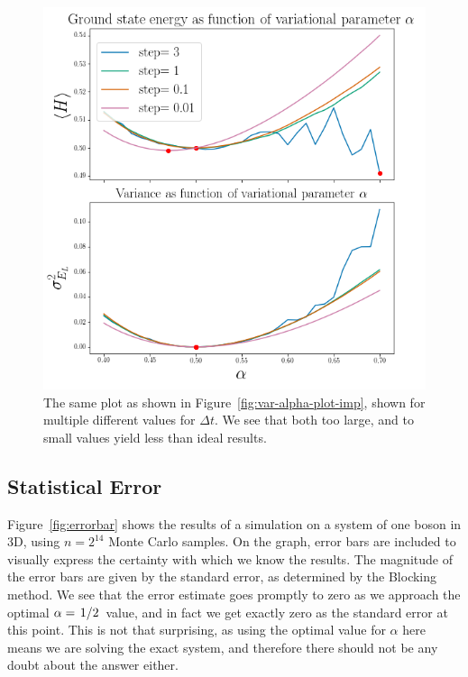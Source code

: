 \documentclass[twocolumn]{article}
\begin{document}
\begin{figure}[ht]
    \centering
    \includegraphics[width=0.9\linewidth]{../results/var-alpha-plot-imp-dts-50000.png}
    \caption{The same plot as shown in Figure~\ref{fig:var-alpha-plot-imp},
    shown for multiple different values for $\Delta t$. We see that both too
    large, and to small values yield less than ideal results.}
    \label{fig:var-alpha-plot-imp-dts}
\end{figure}

\subsection{Statistical Error}

Figure~\ref{fig:errorbar} shows the results of a simulation on a system of one
boson in 3D, using $n=2^{14}$ Monte Carlo samples. On the graph, error bars are
included to visually express the certainty with which we know the results. The
magnitude of the error bars are given by the standard error, as determined by
the Blocking method. We see that the error estimate goes promptly to zero as we
approach the optimal $\alpha=\flatfrac{1}{2}$ value, and in fact we get exactly
zero as the standard error at this point. This is not that surprising, as using
the optimal value for $\alpha$ here means we are solving the exact system, and
therefore there should not be any doubt about the answer either.
\end{document}
